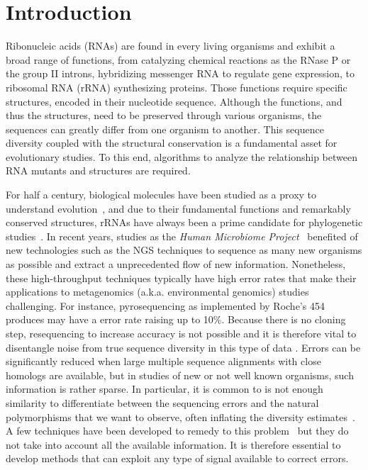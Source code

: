 \section{Introduction}
\label{sec:introduction}

Ribonucleic acids (RNAs) are found in every living organisms and exhibit a broad range of functions, from catalyzing
chemical reactions as the RNase P or the group II introns, hybridizing  messenger RNA to regulate gene expression,
to ribosomal RNA (rRNA) synthesizing proteins. Those functions  require specific structures,  encoded in their nucleotide
sequence. Although the functions, and thus the structures, need to be preserved through various organisms, the sequences
can greatly differ from one organism to another. This sequence diversity coupled with the structural conservation is a fundamental
asset for evolutionary studies. To this end, algorithms to analyze the relationship between RNA mutants and structures are required.

For half a century, biological molecules have been studied as a proxy to understand evolution~\cite{Zuckerkandl1965}, and due
to their fundamental functions and remarkably conserved structures, rRNAs have always been a prime candidate for phylogenetic
studies~\cite{Olsen1986, Olsen1993}. In recent years, studies as the \emph{Human Microbiome Project}~\cite{Turnbaugh2007} benefited
of new technologies such as the NGS techniques to sequence as many new organisms as possible and extract a unprecedented flow of new information. 
Nonetheless, these high-throughput techniques typically have high error rates that make their applications to metagenomics (a.k.a. environmental
genomics) studies challenging. For instance, pyrosequencing as implemented by Roche's 454 produces may have a error rate raising up to 10\%.
Because there is no cloning step, resequencing to increase accuracy is not possible and it is therefore vital to disentangle noise from true sequence
diversity in this type of data \cite{Quince:2009uq}. Errors can be significantly reduced  when large multiple sequence alignments with close homologs
are available, but in studies of new or not well known organisms, such information is rather sparse. In particular, it is common to is not enough  similarity to 
differentiate between the sequencing errors and the natural polymorphisms that we want to observe, often inflating the diversity estimates~\cite{Kunin2010}.
A few techniques have been developed to remedy to this problem~\cite{Quinlan2010,Medvedev2011} but they do not take
into account all the available information. It is therefore essential to develop methods that can exploit any type of signal available to correct errors.  

